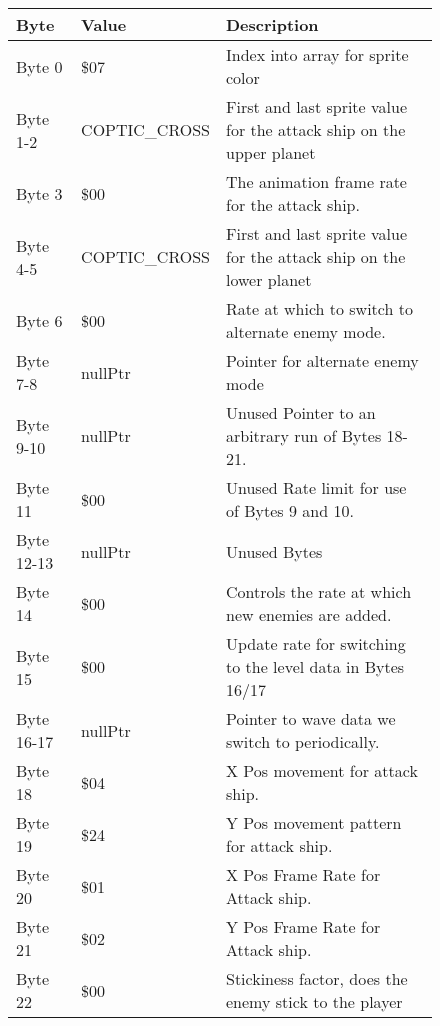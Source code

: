 \begin{figure}[H]
{\begin{adjustbox}{width=12cm}
\begin{tabular}{lll}
\toprule
 Byte       & Value              & Description                                                         \\
\midrule
 Byte 0     & \$07                & Index into array for sprite color                                   \\
 Byte 1-2   & COPTIC\_CROSS       & First and last sprite value for the attack ship on the upper planet \\
 Byte 3     & \$00                & The animation frame rate for the attack ship.                       \\
 Byte 4-5   & COPTIC\_CROSS       & First and last sprite value for the attack ship on the lower planet \\
 Byte 6     & \$00                & Rate at which to switch to alternate enemy mode.                    \\
 Byte 7-8   & nullPtr            & Pointer for alternate enemy mode                                    \\
 Byte 9-10  & nullPtr            & Unused Pointer to an arbitrary run of Bytes 18-21.                  \\
 Byte 11    & \$00                & Unused Rate limit for use of Bytes 9 and 10.                        \\
 Byte 12-13 & nullPtr            & Unused Bytes                                                        \\
 Byte 14    & \$00                & Controls the rate at which new enemies are added.                   \\
 Byte 15    & \$00                & Update rate for switching to the level data in Bytes 16/17          \\
 Byte 16-17 & nullPtr            & Pointer to wave data we switch to periodically.                     \\
 Byte 18    & \$04                & X Pos movement for attack ship.                                     \\
 Byte 19    & \$24                & Y Pos movement pattern for attack ship.                             \\
 Byte 20    & \$01                & X Pos Frame Rate for Attack ship.                                   \\
 Byte 21    & \$02                & Y Pos Frame Rate for Attack ship.                                   \\
 Byte 22    & \$00                & Stickiness factor, does the enemy stick to the player               \\

\end{tabular}
\end{adjustbox}}
\end{figure}
